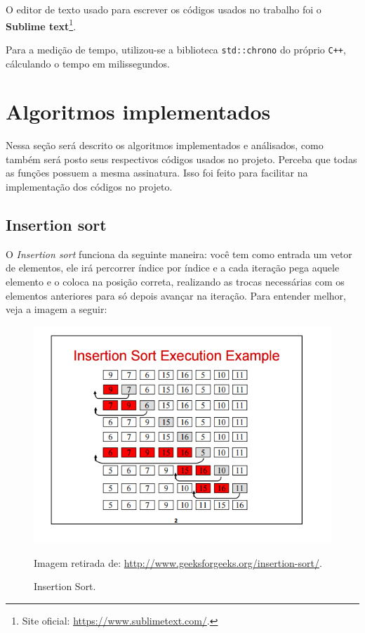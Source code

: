 

O editor de texto usado para escrever os códigos usados no trabalho foi o \textbf{Sublime text}\footnote{Site oficial: \url{https://www.sublimetext.com/}.}.

Para a medição de tempo, utilizou-se a biblioteca \texttt{std::chrono} do próprio \texttt{C++}, cálculando o tempo em milissegundos.

\section{Algoritmos implementados}
Nessa seção será descrito os algoritmos implementados e análisados, como também será posto seus respectivos códigos usados no projeto. Perceba que todas as funções possuem a mesma assinatura. Isso foi feito para facilitar na implementação dos códigos no projeto.

\subsection{Insertion sort}
O \textit{Insertion sort} funciona da seguinte maneira: você tem como entrada um vetor de elementos, ele irá percorrer índice por índice e a cada iteração pega aquele elemento e o coloca na posição correta, realizando as trocas necessárias com os elementos anteriores para só depois avançar na iteração. Para entender melhor, veja a imagem a seguir:

\begin{figure}[H]
	\centering
	\includegraphics[scale=0.6]{img/insertion-sort.png}
	\caption{Insertion Sort.}
	\small{Imagem retirada de: \url{http://www.geeksforgeeks.org/insertion-sort/}.}
	\label{insertion-sort}
\end{figure}

